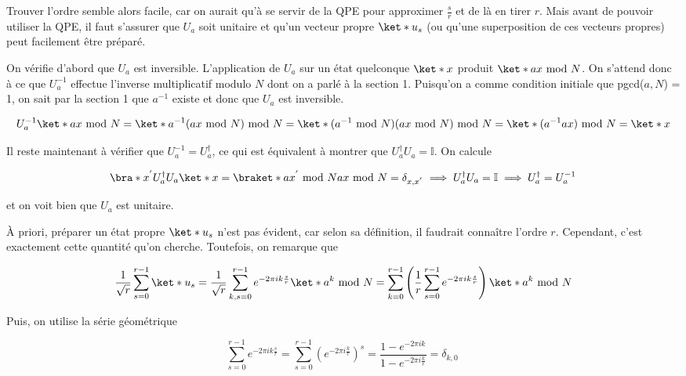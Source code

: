 Trouver l'ordre semble alors facile, car on aurait qu'à se servir de la QPE pour approximer $\frac{s}{r}$ et de là en tirer $r$. Mais avant de pouvoir utiliser la QPE, il faut s'assurer que $U_a$ soit unitaire et qu'un vecteur propre $\ket*{u_s}$ (ou qu'une superposition de ces vecteurs propres) peut facilement être préparé. 

On vérifie d'abord que $U_a$ est inversible. L'application de $U_a$ sur un état quelconque $\ket*{x}$ produit $\ket*{ax \text{ mod } N}$. On s'attend donc à ce que $U_a^{-1}$ effectue l'inverse multiplicatif modulo $N$ dont on a parlé à la section 1. Puisqu'on a comme condition initiale que pgcd($a, N$) = 1, on sait par la section 1 que $a^{-1}$ existe et donc que $U_a$ est inversible.  

\begin{equation*}
    U_a^{-1}\ket*{ax \text{ mod } N} = \ket*{a^{-1} (ax \text{ mod } N ) \text{ mod } N} = \ket*{(a^{-1}\text{ mod } N) (ax \text{ mod } N ) \text{ mod } N} = \ket*{(a^{-1}ax)\text{ mod } N}= \ket*{x}
\end{equation*}

Il reste maintenant à vérifier que $U_a^{-1} = U_a^{\dag}$, ce qui est équivalent à montrer que $U_a^{\dag}U_a = \mathbb{I}$. On calcule 

\begin{equation*}
    \bra*{x^{'}}U_a^{\dag}U_a\ket*{x} = \braket*{ax^{'} \text{ mod } N}{ax \text{ mod } N} = \delta_{x,x^{'}} \implies U_a^{\dag}U_a = \mathbb{I} \implies U_a^{\dag} = U_a^{-1}
\end{equation*}

et on voit bien que $U_a$ est unitaire.

À priori, préparer un état propre $\ket*{u_s}$ n'est pas évident, car selon sa définition, il faudrait connaître l'ordre $r$. Cependant, c'est exactement cette quantité qu'on cherche. Toutefois, on remarque que

\begin{equation*}
    \frac{1}{\sqrt{r}}\sum_{s=0}^{r-1}\ket*{u_s} = \frac{1}{\sqrt{r}} \sum_{k,s = 0}^{r-1}e^{-2\pi i k \frac{s}{r}}\ket*{a^k \text{ mod } N} = \sum_{k=0}^{r-1}\left(\frac{1}{r}\sum_{s=0}^{r-1}e^{-2\pi i k \frac{s}{r}}\right)\ket*{a^k \text{ mod } N}
\end{equation*}

Puis, on utilise la série géométrique 

\begin{equation*}
    \sum_{s=0}^{r-1}e^{-2\pi i k \frac{s}{r}} = \sum_{s=0}^{r-1}\left(e^{-2\pi i \frac{k}{r}}\right)^s = \frac{1 - e^{-2\pi ik}}{1 - e^{-2\pi i \frac{k}{r}}} = \delta_{k,0} \ 
\end{equation*}

